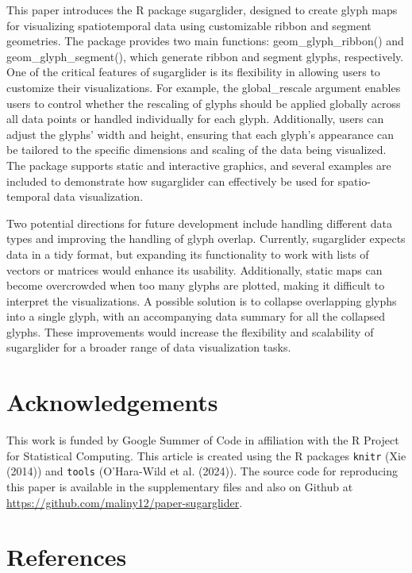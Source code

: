 This paper introduces the R package sugarglider, designed to create glyph maps for visualizing spatiotemporal data using customizable ribbon and segment geometries. The package provides two main functions: geom\_glyph\_ribbon() and geom\_glyph\_segment(), which generate ribbon and segment glyphs, respectively. One of the critical features of sugarglider is its flexibility in allowing users to customize their visualizations. For example, the global\_rescale argument enables users to control whether the rescaling of glyphs should be applied globally across all data points or handled individually for each glyph. Additionally, users can adjust the glyphs' width and height, ensuring that each glyph's appearance can be tailored to the specific dimensions and scaling of the data being visualized. The package supports static and interactive graphics, and several examples are included to demonstrate how sugarglider can effectively be used for spatio-temporal data visualization.

Two potential directions for future development include handling different data types and improving the handling of glyph overlap. Currently, sugarglider expects data in a tidy format, but expanding its functionality to work with lists of vectors or matrices would enhance its usability. Additionally, static maps can become overcrowded when too many glyphs are plotted, making it difficult to interpret the visualizations. A possible solution is to collapse overlapping glyphs into a single glyph, with an accompanying data summary for all the collapsed glyphs. These improvements would increase the flexibility and scalability of sugarglider for a broader range of data visualization tasks.

\hypertarget{acknowledgements}{%
\section{Acknowledgements}\label{acknowledgements}}

This work is funded by Google Summer of Code in affiliation with the R Project for Statistical Computing. This article is created using the R packages \texttt{knitr} (Xie (2014)) and \texttt{tools} (O'Hara-Wild et al. (2024)). The source code for reproducing this paper is available in the supplementary files and also on Github at \url{https://github.com/maliny12/paper-sugarglider}.

\hypertarget{references}{%
\section*{References}\label{references}}

